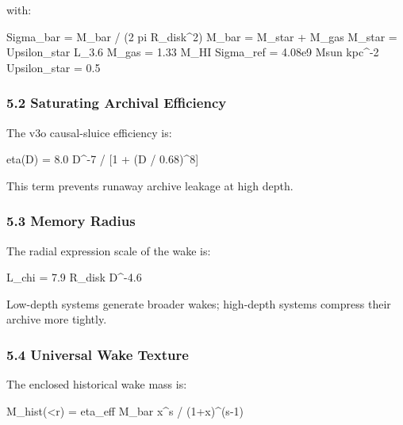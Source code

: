 \documentclass[
]{article}
\newenvironment{Shaded}{}{}
\newcommand{\NormalTok}[1]{#1}
\begin{document}
with:

\begin{Shaded}
\begin{Highlighting}[]
\NormalTok{Sigma\_bar = M\_bar / (2 pi R\_disk\^{}2)}
\NormalTok{M\_bar = M\_star + M\_gas}
\NormalTok{M\_star = Upsilon\_star L\_3.6}
\NormalTok{M\_gas = 1.33 M\_HI}
\NormalTok{Sigma\_ref = 4.08e9 Msun kpc\^{}{-}2}
\NormalTok{Upsilon\_star = 0.5}
\end{Highlighting}
\end{Shaded}

\subsubsection{5.2 Saturating Archival
Efficiency}\label{saturating-archival-efficiency}

The v3o causal-sluice efficiency is:

\begin{Shaded}
\begin{Highlighting}[]
\NormalTok{eta(D) = 8.0 D\^{}{-}7 / [1 + (D / 0.68)\^{}8]}
\end{Highlighting}
\end{Shaded}

This term prevents runaway archive leakage at high depth.

\subsubsection{5.3 Memory Radius}\label{memory-radius}

The radial expression scale of the wake is:

\begin{Shaded}
\begin{Highlighting}[]
\NormalTok{L\_chi = 7.9 R\_disk D\^{}{-}4.6}
\end{Highlighting}
\end{Shaded}

Low-depth systems generate broader wakes; high-depth systems compress
their archive more tightly.

\subsubsection{5.4 Universal Wake Texture}\label{universal-wake-texture}

The enclosed historical wake mass is:

\begin{Shaded}
\begin{Highlighting}[]
\NormalTok{M\_hist(\textless{}r) = eta\_eff M\_bar x\^{}s / (1+x)\^{}(s{-}1)}
\end{Highlighting}
\end{Shaded}
\end{document}
